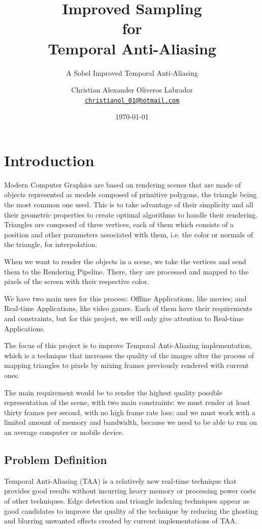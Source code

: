 \documentclass{cslthse-msc}
\author{
	Christian Alexander Oliveros Labrador \\
	{\normalsize \href{mailto:christianol_01@hotmail.com}{\texttt{christianol\_01@hotmail.com}}}
}
\title{Improved Sampling \\for \\Temporal Anti-Aliasing}
\subtitle{A Sobel Improved Temporal Anti-Aliasing}
\date{\today}
\begin{document}
\makefrontmatter
\chapter[Introduction]{Introduction}
Modern Computer Graphics are based on rendering scenes that are made of objects represented as models composed of primitive polygons, the triangle being the most common one used. This is to take advantage of their simplicity and all their geometric properties to create optimal algorithms to handle their rendering. Triangles are composed of three vertices, each of them which consists of a position and other parameters associated with them, i.e. the color or normals of the triangle, for interpolation. 
 
When we want to render the objects in a scene, we take the vertices and send them to the Rendering Pipeline. There, they are processed and mapped to the pixels of the screen with their respective color.

We have two main uses for this process: Offline Applications, like movies; and Real-time Applications, like video games. Each of them have their requirements and constraints, but for this project, we will only give attention to Real-time Applications.

The focus of this project is to improve Temporal Anti-Aliasing implementation, which is a technique that increases the quality of the images after the process of mapping triangles to pixels by mixing frames previously rendered with current ones.

The main requirement would be to render the highest quality possible representation of the scene, with two main constraints: we must render at least thirty frames per second, with no high frame rate loss; and we must work with a limited amount of memory and bandwidth, because we need to be able to run on an average computer or mobile device.  \cite{Doggett2017EDAN35, Shreiner2011}

\section{Problem Definition}
Temporal Anti-Aliasing (TAA) is a relatively new real-time technique that provides good results without incurring heavy memory or processing power costs of other techniques. Edge detection and triangle indexing techniques appear as good candidates to improve the quality of the technique by reducing the ghosting and blurring unwanted effects created by current implementations of TAA. 
\end{document}

